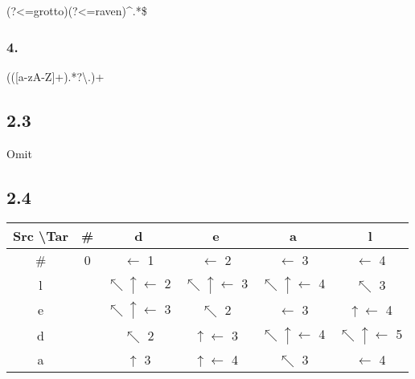 \documentclass{article}
\begin{document}
(?<=grotto)(?<=raven)\^{}.*\$

\subsubsection*{4.}

(([a-zA-Z]+).*?\textbackslash.)+

\subsection*{2.3}

Omit

\subsection*{2.4}

\begin{center}
    \begin{tabular}{| c | c | c | c | c | c | }
        \hline
        Src \textbackslash Tar & \#             & d                                & e                                & a                                & l                                \\
        \hline
        \#                     & 0              & $\leftarrow$ 1                   & $\leftarrow$ 2                   & $\leftarrow$ 3                   & $\leftarrow$ 4                   \\
        \hline
        l                      & \textuparrow 1 & $\nwarrow \uparrow \leftarrow$ 2 & $\nwarrow \uparrow \leftarrow$ 3 & $\nwarrow \uparrow \leftarrow$ 4 & $\nwarrow$ 3                     \\
        \hline
        e                      & \textuparrow 2 & $\nwarrow \uparrow \leftarrow$ 3 & $\nwarrow$ 2                     & $\leftarrow$ 3                   & $\uparrow \leftarrow$ 4          \\
        \hline
        d                      & \textuparrow 3 & $\nwarrow$ 2                     & $\uparrow \leftarrow$ 3          & $\nwarrow \uparrow \leftarrow$ 4 & $\nwarrow \uparrow \leftarrow$ 5 \\
        \hline
        a                      & \textuparrow 4 & $\uparrow$ 3                     & $\uparrow \leftarrow$ 4          & $\nwarrow$ 3                     & $\leftarrow$ 4                   \\
        \hline
    \end{tabular}
\end{center}
\end{document}

